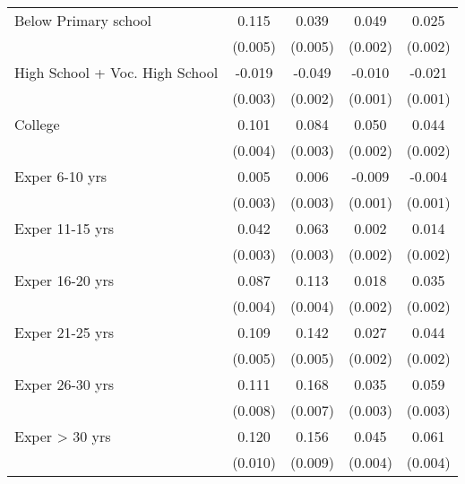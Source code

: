 \begin{table}[htbp]
\begin{tabular}{l*{4}{c}}
Below Primary school&       0.115\sym{***}&       0.039\sym{***}&       0.049\sym{***}&       0.025\sym{***}\\
                    &     (0.005)         &     (0.005)         &     (0.002)         &     (0.002)         \\
High School + Voc. High School&      -0.019\sym{***}&      -0.049\sym{***}&      -0.010\sym{***}&      -0.021\sym{***}\\
                    &     (0.003)         &     (0.002)         &     (0.001)         &     (0.001)         \\
College             &       0.101\sym{***}&       0.084\sym{***}&       0.050\sym{***}&       0.044\sym{***}\\
                    &     (0.004)         &     (0.003)         &     (0.002)         &     (0.002)         \\
Exper 6-10 yrs      &       0.005         &       0.006\sym{*}  &      -0.009\sym{***}&      -0.004\sym{***}\\
                    &     (0.003)         &     (0.003)         &     (0.001)         &     (0.001)         \\
Exper 11-15 yrs     &       0.042\sym{***}&       0.063\sym{***}&       0.002         &       0.014\sym{***}\\
                    &     (0.003)         &     (0.003)         &     (0.002)         &     (0.002)         \\
Exper 16-20 yrs     &       0.087\sym{***}&       0.113\sym{***}&       0.018\sym{***}&       0.035\sym{***}\\
                    &     (0.004)         &     (0.004)         &     (0.002)         &     (0.002)         \\
Exper 21-25 yrs     &       0.109\sym{***}&       0.142\sym{***}&       0.027\sym{***}&       0.044\sym{***}\\
                    &     (0.005)         &     (0.005)         &     (0.002)         &     (0.002)         \\
Exper 26-30 yrs     &       0.111\sym{***}&       0.168\sym{***}&       0.035\sym{***}&       0.059\sym{***}\\
                    &     (0.008)         &     (0.007)         &     (0.003)         &     (0.003)         \\
Exper > 30 yrs      &       0.120\sym{***}&       0.156\sym{***}&       0.045\sym{***}&       0.061\sym{***}\\
                    &     (0.010)         &     (0.009)         &     (0.004)         &     (0.004)         \\

\end{tabular}
\end{table}
